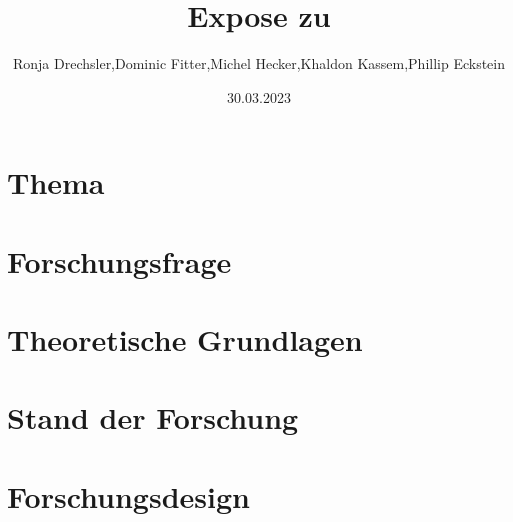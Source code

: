 \documentclass[12pt]{article}
\title{Expose zu}
\date{30.03.2023}
\author{Ronja Drechsler,Dominic Fitter,Michel Hecker,Khaldon Kassem,Phillip Eckstein}
\begin{document}
\maketitle

\section{Thema}
\section{Forschungsfrage}
\section{Theoretische Grundlagen}
\section{Stand der Forschung}
\section{Forschungsdesign}
\end{document}
